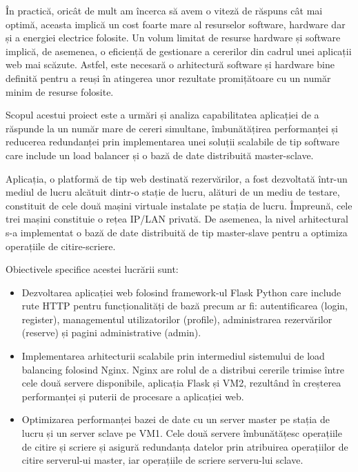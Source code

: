 \documentclass[12pt, a4paper, oneside, romanian]{teza-upb}
\begin{document}
	În practică, oricât de mult am încerca să avem o viteză de răspuns cât mai optimă, aceasta implică un cost foarte mare al resurselor software, hardware dar și a energiei electrice folosite. Un volum limitat de resurse hardware și software implică, de asemenea, o eficiență de gestionare a cererilor din cadrul unei aplicații web mai scăzute. Astfel, este necesară o arhitectură software și hardware bine definită pentru a reuși în atingerea unor rezultate promițătoare cu un număr minim de resurse folosite.
	
	
	Scopul acestui proiect este a urmări și analiza capabilitatea aplicației de a răspunde la un număr mare de cereri simultane, îmbunătățirea performanței și reducerea redundanței prin implementarea unei soluții scalabile de tip software care include un load balancer și o bază de date distribuită master-sclave. 
	
	Aplicația, o platformă de tip web destinată rezervărilor, a fost dezvoltată într-un mediul de lucru alcătuit dintr-o stație de lucru, alături de un mediu de testare, constituit de cele două mașini virtuale instalate pe stația de lucru. Împreună, cele trei mașini constituie o rețea IP/LAN privată. De asemenea, la nivel arhitectural s-a implementat o bază de date distribuită de tip master-slave pentru a optimiza operațiile de citire-scriere.  
	
	Obiectivele specifice acestei lucrării sunt:
	\begin{itemize}
		\item Dezvoltarea aplicației web folosind framework-ul Flask Python care include rute HTTP pentru funcționalități de bază precum ar fi: autentificarea (login, register), managementul utilizatorilor (profile), administrarea rezervărilor (reserve) și pagini administrative (admin).
		
		\item Implementarea arhitecturii scalabile prin intermediul sistemului de load balancing folosind Nginx. Nginx are rolul de a distribui cererile trimise între cele două servere disponibile, aplicația Flask și VM2, rezultând în creșterea performanței și puterii de procesare a aplicației web.
		
		\item Optimizarea performanței bazei de date cu un server master pe stația de lucru și un server sclave pe VM1. Cele două servere îmbunătățesc operațiile de citire și scriere și asigură redundanța datelor prin atribuirea operațiilor de citire serverul-ui master, iar operațiile de scriere serveru-lui sclave.
	\end{itemize}
	
\end{document}
